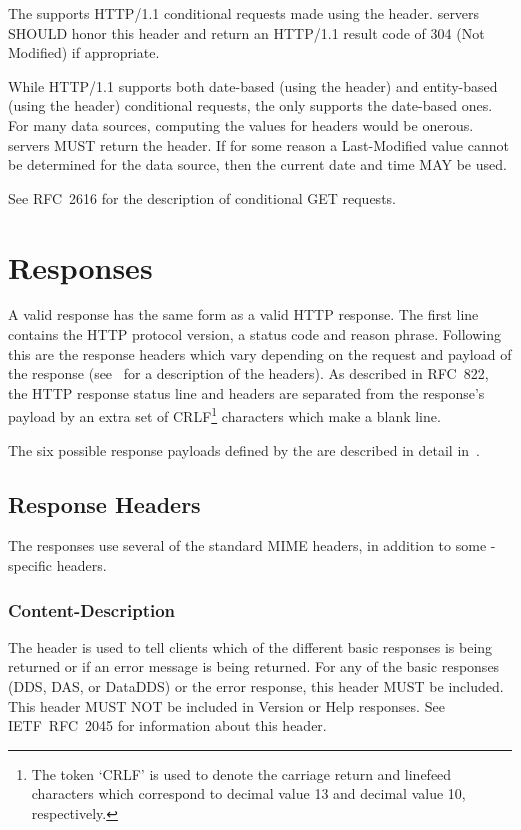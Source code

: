\documentclass[justify]{nasa-ese}
\begin{document}
The \DAP supports HTTP/1.1 conditional requests made using the
 header. \DAP servers SHOULD honor this header
and return an HTTP/1.1 result code of 304 (Not Modified) if
appropriate. 

While HTTP/1.1 supports both date-based (using the 
header) and entity-based (using the  header) conditional
requests, the \DAP only supports the date-based ones. For many data
sources, computing the values for  headers would be onerous.
\DAP servers MUST return the  header. If for some
reason a Last-Modified value cannot be determined for the data source,
then the current date and time MAY be used.

See RFC~2616\cite{rfc2616} for the description of
conditional GET requests.

\section{Responses}
\label{sec-responses}

A valid \DAP response has the same form as a valid \ac{HTTP} response. The
first line contains the \ac{HTTP} protocol version, a status code and reason
phrase\cite{rfc2616}. Following this are the response headers which vary
depending on the request and payload of the response
(see~ for a description of the headers). As
described in RFC~822\cite{rfc822}, the \ac{HTTP} response status line and
headers are separated from the response's payload by an extra set of
CRLF\footnote{The token `CRLF' is used to denote the carriage return and
  linefeed characters which correspond to decimal value 13 and decimal value
  10, respectively.} characters which make a blank line.

The six possible response payloads defined by the \DAP are described
in detail in~.

\subsection{Response Headers}
\label{sec-resp-headers}

The \DAP responses use several of the standard MIME headers, in
addition to some \DAP-specific headers.

\subsubsection{Content-Description}
The  header is used to tell clients which of the
different basic responses is being returned or if an error message is being
returned. For any of the basic responses (\ac{DDS}, \ac{DAS}, or
\ac{DataDDS}) or the error response, this header MUST be included. This
header MUST NOT be included in Version or Help responses. See
IETF~RFC~2045\cite{rfc2045} for information about this header.
\end{document}
